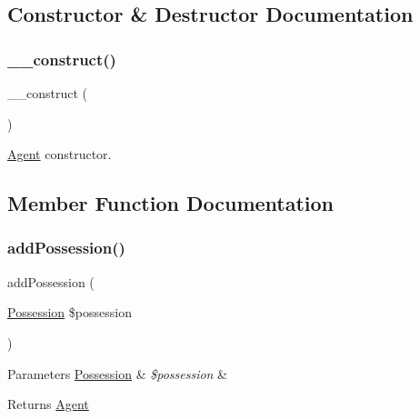 \subsection{Constructor \& Destructor Documentation}
\mbox{\label{class_app_1_1_entity_1_1_agent_a095c5d389db211932136b53f25f39685}} 
\subsubsection{\texorpdfstring{\_\_construct()}{\_\_construct()}}
{\footnotesize\ttfamily \+\_\+\+\_\+construct (\begin{DoxyParamCaption}{ }\end{DoxyParamCaption})}

\mbox{\hyperlink{class_app_1_1_entity_1_1_agent}{Agent}} constructor. 

\subsection{Member Function Documentation}
\mbox{\label{class_app_1_1_entity_1_1_agent_a5188d786a9c3e2f2936d783276947acc}} 
\subsubsection{\texorpdfstring{addPossession()}{addPossession()}}
{\footnotesize\ttfamily add\+Possession (\begin{DoxyParamCaption}\item[{\mbox{\hyperlink{class_app_1_1_entity_1_1_possession}{Possession}}}]{\$possession }\end{DoxyParamCaption})}


\begin{DoxyParams}[1]{Parameters}
\mbox{\hyperlink{class_app_1_1_entity_1_1_possession}{Possession}} & {\em \$possession} & \\
\hline
\end{DoxyParams}
\begin{DoxyReturn}{Returns}
\mbox{\hyperlink{class_app_1_1_entity_1_1_agent}{Agent}} 
\end{DoxyReturn}
\mbox{\label{class_app_1_1_entity_1_1_agent_a96f4e373af162c8fbc86093ec24f4340}} 
